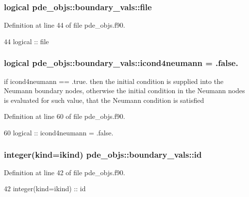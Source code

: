 \subsubsection[{file}]{\setlength{\rightskip}{0pt plus 5cm}logical pde\+\_\+objs\+::boundary\+\_\+vals\+::file}\label{structpde__objs_1_1boundary__vals_ad4b1a963e3c0b630d6acb38f386825ce}


Definition at line 44 of file pde\+\_\+objs.\+f90.


\begin{DoxyCode}
44     \textcolor{keywordtype}{logical}             :: file
\end{DoxyCode}
\subsubsection[{icond4neumann}]{\setlength{\rightskip}{0pt plus 5cm}logical pde\+\_\+objs\+::boundary\+\_\+vals\+::icond4neumann = .false.}\label{structpde__objs_1_1boundary__vals_a34b23ee02d036773458073918eae3158}


if icond4neumann == .true. then the initial condition is supplied into the Neumann boundary nodes, otherwise the initial condition in the Neumann nodes is evaluated for such value, that the Neumann condition is satisfied 



Definition at line 60 of file pde\+\_\+objs.\+f90.


\begin{DoxyCode}
60     \textcolor{keywordtype}{logical} :: icond4neumann = .false.
\end{DoxyCode}
\subsubsection[{id}]{\setlength{\rightskip}{0pt plus 5cm}integer(kind=ikind) pde\+\_\+objs\+::boundary\+\_\+vals\+::id}\label{structpde__objs_1_1boundary__vals_ae999a5f251cf5202ad25d3b8f29419b7}


Definition at line 42 of file pde\+\_\+objs.\+f90.


\begin{DoxyCode}
42     \textcolor{keywordtype}{integer(kind=ikind)} :: id
\end{DoxyCode}
